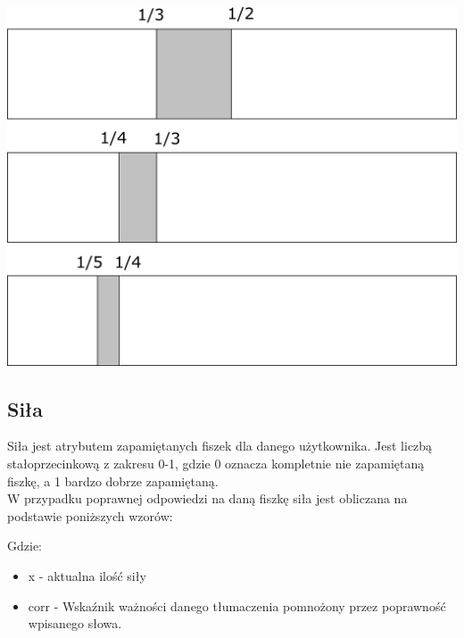 \begin{center}
	\centering
	\includegraphics[width=\textwidth]{images/interval.png}
\end{center}


\newpage
\subsection{Siła}

Siła jest atrybutem zapamiętanych fiszek dla danego użytkownika. Jest liczbą stałoprzecinkową z zakresu 0-1, gdzie 0 oznacza kompletnie nie zapamiętaną fiszkę, a 1 bardzo dobrze zapamiętaną.  \\
W przypadku poprawnej odpowiedzi na daną fiszkę siła jest obliczana na podstawie poniższych wzorów:  \\


Gdzie:
\begin{itemize}
	\item x - aktualna ilość siły
	\item corr - Wskaźnik ważności danego tłumaczenia pomnożony przez poprawność wpisanego słowa.
\end{itemize}



